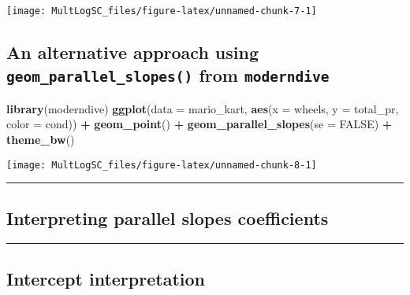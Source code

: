 \documentclass[
]{book}
\newenvironment{Shaded}{\begin{snugshade}}{\end{snugshade}}
\newcommand{\DataTypeTok}[1]{\textcolor[rgb]{0.13,0.29,0.53}{#1}}
\newcommand{\KeywordTok}[1]{\textcolor[rgb]{0.13,0.29,0.53}{\textbf{#1}}}
\newcommand{\NormalTok}[1]{#1}
\newcommand{\OperatorTok}[1]{\textcolor[rgb]{0.81,0.36,0.00}{\textbf{#1}}}
\newcommand{\OtherTok}[1]{\textcolor[rgb]{0.56,0.35,0.01}{#1}}
\newcommand{\StringTok}[1]{\textcolor[rgb]{0.31,0.60,0.02}{#1}}
\begin{document}
\begin{center}\texttt{[image: MultLogSC\_files/figure-latex/unnamed-chunk-7-1]} \end{center}

\hypertarget{an-alternative-approach-using-geom_parallel_slopes-from-moderndive}{%
\subsection{\texorpdfstring{An alternative approach using \texttt{geom\_parallel\_slopes()} from \texttt{moderndive}}{An alternative approach using geom\_parallel\_slopes() from moderndive}}\label{an-alternative-approach-using-geom_parallel_slopes-from-moderndive}}

\begin{Shaded}
\begin{Highlighting}[]
\KeywordTok{library}\NormalTok{(moderndive)}
\KeywordTok{ggplot}\NormalTok{(}\DataTypeTok{data =}\NormalTok{ mario_kart, }\KeywordTok{aes}\NormalTok{(}\DataTypeTok{x =}\NormalTok{ wheels, }\DataTypeTok{y =}\NormalTok{ total_pr, }\DataTypeTok{color =}\NormalTok{ cond)) }\OperatorTok{+}
\StringTok{  }\KeywordTok{geom_point}\NormalTok{() }\OperatorTok{+}
\StringTok{  }\KeywordTok{geom_parallel_slopes}\NormalTok{(}\DataTypeTok{se =} \OtherTok{FALSE}\NormalTok{) }\OperatorTok{+}\StringTok{ }
\StringTok{  }\KeywordTok{theme_bw}\NormalTok{()}
\end{Highlighting}
\end{Shaded}

\begin{center}\texttt{[image: MultLogSC\_files/figure-latex/unnamed-chunk-8-1]} \end{center}

\begin{center}\rule{0.5\linewidth}{0.5pt}\end{center}

\hypertarget{interpreting-parallel-slopes-coefficients}{%
\subsection*{Interpreting parallel slopes coefficients}\label{interpreting-parallel-slopes-coefficients}}

\begin{center}\rule{0.5\linewidth}{0.5pt}\end{center}

\hypertarget{intercept-interpretation}{%
\subsection*{Intercept interpretation}\label{intercept-interpretation}}
\end{document}
